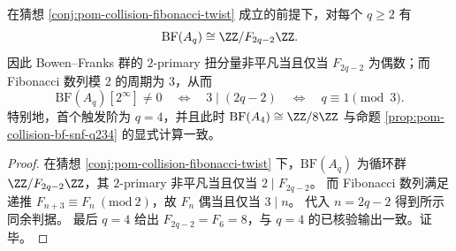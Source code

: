\begin{corollary}\label{cor:pom-collision-fibonacci-twist-2primary-first-appearance}
在猜想 \ref{conj:pom-collision-fibonacci-twist} 成立的前提下，对每个 \(q\ge 2\) 有
\[
\mathrm{BF}(A_q)\cong \ZZ/F_{2q-2}\ZZ.
\]
因此 Bowen--Franks 群的 \(2\)-primary 扭分量非平凡当且仅当 \(F_{2q-2}\) 为偶数；而 Fibonacci 数列模 \(2\) 的周期为 \(3\)，从而
\[
\mathrm{BF}(A_q)[2^\infty]\neq 0
\quad\Longleftrightarrow\quad
3\mid(2q-2)
\quad\Longleftrightarrow\quad
q\equiv 1\pmod 3.
\]
特别地，首个触发阶为 \(q=4\)，并且此时
\(
\mathrm{BF}(A_4)\cong \ZZ/8\ZZ
\) 与命题 \ref{prop:pom-collision-bf-snf-q234} 的显式计算一致。
\end{corollary}
\begin{proof}
在猜想 \ref{conj:pom-collision-fibonacci-twist} 下，\(\mathrm{BF}(A_q)\) 为循环群 \(\ZZ/F_{2q-2}\ZZ\)，其 \(2\)-primary 非平凡当且仅当 \(2\mid F_{2q-2}\)。
而 Fibonacci 数列满足递推 \(F_{n+3}\equiv F_n\ (\mathrm{mod}\ 2)\)，故 \(F_n\) 偶当且仅当 \(3\mid n\)。
代入 \(n=2q-2\) 得到所示同余判据。
最后 \(q=4\) 给出 \(F_{2q-2}=F_6=8\)，与 \(q=4\) 的已核验输出一致。证毕。
\end{proof}

